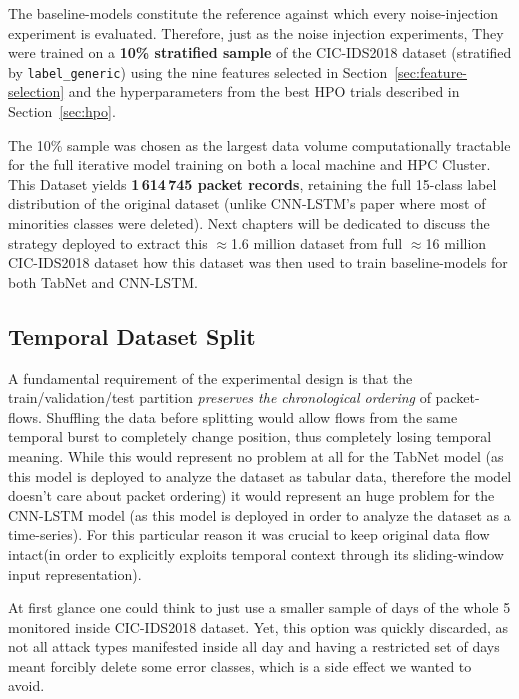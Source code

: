 \documentclass[../main.tex]{subfiles}
\begin{document}
The baseline-models constitute the reference against which every noise-injection experiment is evaluated. Therefore, just as the noise injection experiments, They were trained on a \textbf{10\% stratified sample} of the CIC-IDS2018 dataset (stratified by \texttt{label\_generic}) using the nine features selected in Section~\ref{sec:feature-selection} and the hyperparameters from the best HPO trials described in Section~\ref{sec:hpo}. 

The 10\% sample was chosen as the largest data volume computationally tractable for the full iterative model training on both a local machine and HPC Cluster. This Dataset yields \textbf{1\,614\,745 packet records}, retaining the full 15-class label distribution of the original dataset (unlike CNN-LSTM's paper\supercite{jablaoui2024effective} where most of minorities classes were deleted). Next chapters will be dedicated to discuss the strategy deployed to extract this $\approx$1.6 million dataset from full $\approx$16 million CIC-IDS2018 dataset how this dataset was then used to train baseline-models for both TabNet and CNN-LSTM. 

\subsection{Temporal Dataset Split}
\label{sec:temporal-split}

A fundamental requirement of the experimental design is that the train/validation/test partition \emph{preserves the chronological ordering} of packet-flows. Shuffling the data before splitting would allow flows from the same temporal burst to completely change position, thus completely losing temporal meaning. While this would represent no problem at all for the TabNet model (as this model is deployed to analyze the dataset as tabular data, therefore the model doesn't care about packet ordering) it would represent an huge problem for the CNN-LSTM model (as this model is deployed in order to analyze the dataset as a time-series). For this particular reason it was  crucial to keep original data flow intact(in order to explicitly exploits temporal context through its sliding-window input representation). 

At first glance one could think to just use a smaller sample of days of the whole 5 monitored inside CIC-IDS2018 dataset. Yet, this option was quickly discarded, as not all attack types manifested inside all day and having a restricted set of days meant forcibly delete some error classes, which is a side effect we wanted to avoid.   
\end{document}
